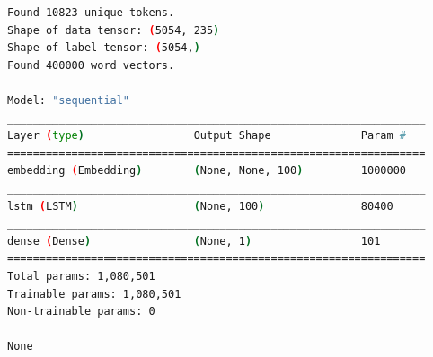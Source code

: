 \begin{lstlisting}[language=bash]
Found 10823 unique tokens.
Shape of data tensor: (5054, 235)
Shape of label tensor: (5054,)
Found 400000 word vectors.

Model: "sequential"
_________________________________________________________________
Layer (type)                 Output Shape              Param #   
=================================================================
embedding (Embedding)        (None, None, 100)         1000000   
_________________________________________________________________
lstm (LSTM)                  (None, 100)               80400     
_________________________________________________________________
dense (Dense)                (None, 1)                 101       
=================================================================
Total params: 1,080,501
Trainable params: 1,080,501
Non-trainable params: 0
_________________________________________________________________
None


\end{lstlisting}
